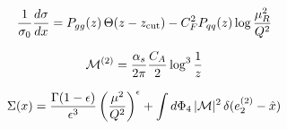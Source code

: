\begin{equation}
  \frac{1}{\sigma_0} \frac{d\sigma}{dx} = P_{gg}(z) \, \Theta(z - z_{\rm cut}) - C_F^2 P_{qq}(z) \log\frac{\mu_R^2}{Q^2}
  \label{eq:5}
\end{equation}

\begin{equation}
  \mathcal{M}^{(2)} = \frac{\alpha_s}{2\pi} \frac{C_A}{2} \log^{3} \frac{1}{z}
  \label{eq:7}
\end{equation}

\begin{equation}
  \Sigma(x) = \frac{\Gamma(1-\epsilon)}{\epsilon^{3}} \left(\frac{\mu^2}{Q^2}\right)^{\epsilon} + \int d\Phi_{4} \, |\mathcal{M}|^2 \, \delta(e_2^{(2)} - \hat{x})
  \label{eq:8}
\end{equation}

